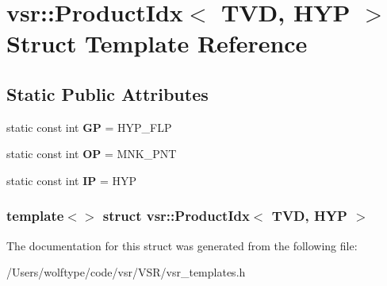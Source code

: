 \hypertarget{structvsr_1_1_product_idx_3_01_t_v_d_00_01_h_y_p_01_4}{\section{vsr\-:\-:Product\-Idx$<$ T\-V\-D, H\-Y\-P $>$ Struct Template Reference}
\label{structvsr_1_1_product_idx_3_01_t_v_d_00_01_h_y_p_01_4}
}
\subsection*{Static Public Attributes}
\begin{DoxyCompactItemize}
\item 
\hypertarget{structvsr_1_1_product_idx_3_01_t_v_d_00_01_h_y_p_01_4_a26a93c9062d4bbcacad343d021c4c31d}{static const int {\bfseries G\-P} = H\-Y\-P\-\_\-\-F\-L\-P}\label{structvsr_1_1_product_idx_3_01_t_v_d_00_01_h_y_p_01_4_a26a93c9062d4bbcacad343d021c4c31d}

\item 
\hypertarget{structvsr_1_1_product_idx_3_01_t_v_d_00_01_h_y_p_01_4_a7f727b766515a5094a269cd7c7e61247}{static const int {\bfseries O\-P} = M\-N\-K\-\_\-\-P\-N\-T}\label{structvsr_1_1_product_idx_3_01_t_v_d_00_01_h_y_p_01_4_a7f727b766515a5094a269cd7c7e61247}

\item 
\hypertarget{structvsr_1_1_product_idx_3_01_t_v_d_00_01_h_y_p_01_4_a335401dcab783f3877b8193660351c47}{static const int {\bfseries I\-P} = H\-Y\-P}\label{structvsr_1_1_product_idx_3_01_t_v_d_00_01_h_y_p_01_4_a335401dcab783f3877b8193660351c47}

\end{DoxyCompactItemize}
\subsubsection*{template$<$$>$ struct vsr\-::\-Product\-Idx$<$ T\-V\-D, H\-Y\-P $>$}



The documentation for this struct was generated from the following file\-:\begin{DoxyCompactItemize}
\item 
/\-Users/wolftype/code/vsr/\-V\-S\-R/vsr\-\_\-templates.\-h\end{DoxyCompactItemize}
